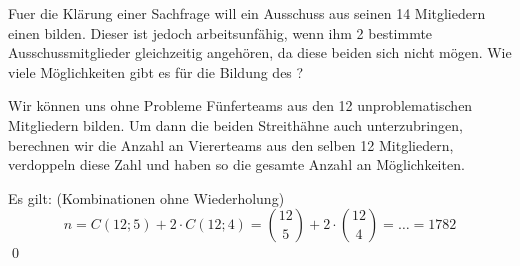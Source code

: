 \documentclass{abgabe}
\begin{document}
\begin{questions}
    \question
    Fuer die Klärung einer Sachfrage will ein Ausschuss aus seinen 14 Mitgliedern einen  bilden. 
    Dieser ist jedoch arbeitsunfähig, wenn ihm 2 bestimmte Ausschussmitglieder gleichzeitig angehören, da diese beiden sich nicht mögen.
    Wie viele Möglichkeiten gibt es für die Bildung des ?
    \begin{solution}
        Wir können uns ohne Probleme Fünferteams aus den 12 unproblematischen Mitgliedern bilden. 
        Um dann die beiden Streithähne auch unterzubringen, berechnen wir die Anzahl an Viererteams aus den selben 12 Mitgliedern, verdoppeln diese Zahl und haben so die gesamte Anzahl an Möglichkeiten.

        Es gilt: (Kombinationen ohne Wiederholung)
        \[ 
            n = C(12;5) + 2 \cdot C(12;4) = \binom{12}{5} + 2 \cdot \binom{12}{4} = \ldots = \num{1782}
        \] 
        \qed
    \end{solution}
\end{questions}
\end{document}
